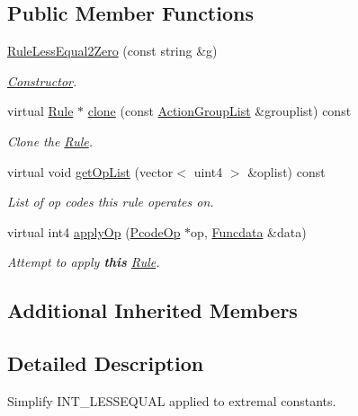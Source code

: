 \subsection*{Public Member Functions}
\begin{DoxyCompactItemize}
\item 
\mbox{\hyperlink{class_rule_less_equal2_zero_a84fa90c33d058dab82aa8df56623f251}{Rule\+Less\+Equal2\+Zero}} (const string \&g)
\begin{DoxyCompactList}\small\item\em \mbox{\hyperlink{class_constructor}{Constructor}}. \end{DoxyCompactList}\item 
virtual \mbox{\hyperlink{class_rule}{Rule}} $\ast$ \mbox{\hyperlink{class_rule_less_equal2_zero_a52fe85f6b4dd887377b455bfca8612c3}{clone}} (const \mbox{\hyperlink{class_action_group_list}{Action\+Group\+List}} \&grouplist) const
\begin{DoxyCompactList}\small\item\em Clone the \mbox{\hyperlink{class_rule}{Rule}}. \end{DoxyCompactList}\item 
virtual void \mbox{\hyperlink{class_rule_less_equal2_zero_aba0936aa13755f400df52f33624aa98a}{get\+Op\+List}} (vector$<$ uint4 $>$ \&oplist) const
\begin{DoxyCompactList}\small\item\em List of op codes this rule operates on. \end{DoxyCompactList}\item 
virtual int4 \mbox{\hyperlink{class_rule_less_equal2_zero_a1d41372d5ac60e36cca1ffcb04e33528}{apply\+Op}} (\mbox{\hyperlink{class_pcode_op}{Pcode\+Op}} $\ast$op, \mbox{\hyperlink{class_funcdata}{Funcdata}} \&data)
\begin{DoxyCompactList}\small\item\em Attempt to apply {\bfseries{this}} \mbox{\hyperlink{class_rule}{Rule}}. \end{DoxyCompactList}\end{DoxyCompactItemize}
\subsection*{Additional Inherited Members}


\subsection{Detailed Description}
Simplify I\+N\+T\+\_\+\+L\+E\+S\+S\+E\+Q\+U\+AL applied to extremal constants. 

